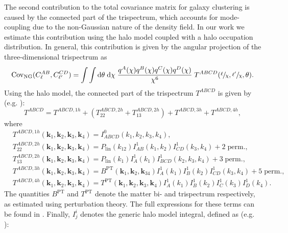 \documentclass[a4paper,11pt]{article}
\begin{document}
The second contribution to the total covariance matrix for galaxy clustering is caused by the connected part of the trispectrum, which accounts for mode-coupling due to the non-Gaussian nature of the density field. In our work we estimate this contribution using the halo model coupled with a halo occupation distribution. In general, this contribution is given by the angular projection of the three-dimensional trispectrum as
\begin{equation}
\mathrm{Cov}_{\mathrm{NG}}(C^{AB}_{\ell}, C^{CD}_{\ell'}) = \int \int \mathrm{d}\theta \;\mathrm{d}\chi \; \frac{q^{A}(\chi)q^{B}(\chi)q^{C}(\chi)q^{D}(\chi)}{\chi^{6}} \; T^{ABCD}(\sfrac{\ell}{\chi}, \sfrac{\ell'}{\chi}, \theta).
\end{equation}
Using the halo model, the connected part of the trispectrum $T^{ABCD}$ is given by (e.g. \cite{Takada:2013}):
\begin{equation}
T^{ABCD} = T^{ABCD, 1h} + (T^{ABCD, 2h}_{22} + T^{ABCD, 2h}_{13}) + T^{ABCD, 3h} + T^{ABCD, 4h},
\end{equation}
where
\begin{align}
&T^{ABCD, 1h}(\mathbf{k}_{1}, \mathbf{k}_{2}, \mathbf{k}_{3}, \mathbf{k}_{4}) = I^{0}_{ABCD}(k_{1}, k_{2}, k_{3}, k_{4}), \\
&T^{ABCD, 2h}_{22}(\mathbf{k}_{1}, \mathbf{k}_{2}, \mathbf{k}_{3}, \mathbf{k}_{4}) = P_{\mathrm{lin}}(k_{12})I^{1}_{AB}(k_{1}, k_{2})I^{1}_{CD}(k_{3}, k_{4}) + 2 \; \mathrm{perm.}, \\
&T^{ABCD, 2h}_{13}(\mathbf{k}_{1}, \mathbf{k}_{2}, \mathbf{k}_{3}, \mathbf{k}_{4}) = P_{\mathrm{lin}}(k_{1})I^{1}_{A}(k_{1})I^{1}_{BCD}(k_{2}, k_{3}, k_{4}) + 3 \; \mathrm{perm.}, \\
&T^{ABCD, 3h}(\mathbf{k}_{1}, \mathbf{k}_{2}, \mathbf{k}_{3}, \mathbf{k}_{4}) = B^{\mathrm{PT}}(\mathbf{k}_{1}, \mathbf{k}_{2}, \mathbf{k}_{34})I^{1}_{A}(k_{1})I^{1}_{B}(k_{2})I^{1}_{CD}(k_{3}, k_{4}) + 5 \; \mathrm{perm.}, \\
&T^{ABCD, 4h}(\mathbf{k}_{1}, \mathbf{k}_{2}, \mathbf{k}_{3}, \mathbf{k}_{4}) = T^{\mathrm{PT}}(\mathbf{k}_{1}, \mathbf{k}_{2}, \mathbf{k}_{3}, \mathbf{k}_{4})I^{1}_{A}(k_{1})I^{1}_{B}(k_{2})I^{1}_{C}(k_{3})I^{1}_{D}(k_{4}).
\end{align}
The quantities $B^{\mathrm{PT}}$ and $T^{\mathrm{PT}}$ denote the matter bi- and trispectrum respectively, as estimated using perturbation theory. The full expressions for these terms can be found in \cite{Takada:2013}. Finally, $I^{i}_{j}$ denotes the generic halo model integral, defined as (e.g. \cite{Krause:2017}):
\end{document}

